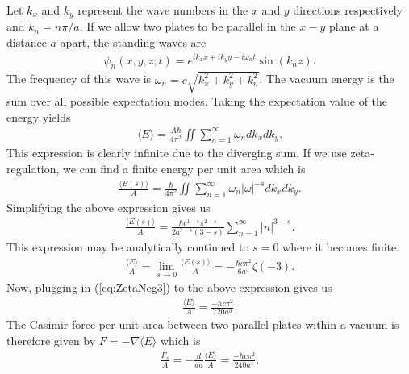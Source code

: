 \documentclass[landscape,a0paper,fontscale=0.285]{baposter} %
\begin{document}
\begin{poster}
{\begin{multicols}{2}
Let $k_x$ and $k_y$ represent the wave numbers in the $x$ and $y$ directions respectively and $k_n=n\pi/a$. If we allow two plates to be parallel in the $x-y$ plane at a distance $a$ apart, the standing waves are
\begin{align}
\psi_n(x,y,z;t)= e^{ik_xx+ik_yy-i\omega_nt}\sin(k_nz).
\end{align}
The frequency of this wave is $\omega_n = c \sqrt{k_x^2+k_y^2+k_n^2}$. The vacuum energy is the sum over all possible expectation modes. Taking the expectation value of the energy yields
\begin{align}
\langle E \rangle = \frac{A\hbar}{4\pi^2} \iint \sum_{n=1}^{\infty}\omega_ndk_xdk_y.
\end{align}
This expression is clearly infinite due to the diverging sum. If we use zeta-regulation, we can find a finite energy per unit area which is
\begin{align}
\frac{\langle E(s) \rangle}{A} = \frac{\hbar}{4\pi^2} \iint \sum_{n=1}^{\infty}\omega_n|\omega|^{-s}dk_xdk_y.
\end{align}
Simplifying the above expression gives us
\begin{align}
\frac{\langle E(s) \rangle}{A} = \frac{\hbar c^{1-s}\pi^{2-s}}{{2a^{3-s}(3-s)}}\sum_{n=1}^{\infty}|n|^{3-s}.
\end{align}
This expression may be analytically continued to $s=0$ where it becomes finite. 
\begin{align}
\frac{\langle E \rangle}{A} = \lim_{s\rightarrow 0}\frac{\langle E(s) \rangle}{A} = -\frac{\hbar c \pi^2}{6a^3}\zeta(-3).
\end{align}
Now, plugging in (\ref{eq:ZetaNeg3}) to the above expression gives us
\begin{align}
\frac{\langle E \rangle}{A} = \frac{-\hbar c \pi^2}{720a^3}.
\end{align}
The Casimir force per unit area between two parallel plates within a vacuum is therefore given by $F=-\nabla \langle E \rangle$ which is
\begin{align}
\frac{F_c}{A} = -\frac{d}{da}\frac{\langle E \rangle}{A} = \frac{-\hbar c \pi^2}{240a^4}.
\end{align}
\hspace{1cm} %
\end{multicols}
}



\end{poster}
\end{document}

